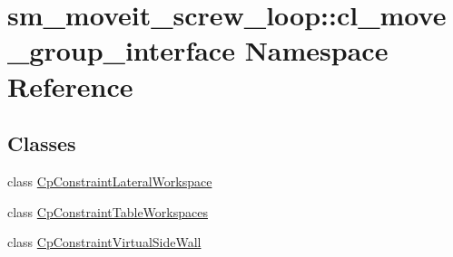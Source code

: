 \hypertarget{namespacesm__moveit__screw__loop_1_1cl__move__group__interface}{}\section{sm\+\_\+moveit\+\_\+screw\+\_\+loop\+:\+:cl\+\_\+move\+\_\+group\+\_\+interface Namespace Reference}
\label{namespacesm__moveit__screw__loop_1_1cl__move__group__interface}
\subsection*{Classes}
\begin{DoxyCompactItemize}
\item 
class \hyperlink{classsm__moveit__screw__loop_1_1cl__move__group__interface_1_1CpConstraintLateralWorkspace}{Cp\+Constraint\+Lateral\+Workspace}
\item 
class \hyperlink{classsm__moveit__screw__loop_1_1cl__move__group__interface_1_1CpConstraintTableWorkspaces}{Cp\+Constraint\+Table\+Workspaces}
\item 
class \hyperlink{classsm__moveit__screw__loop_1_1cl__move__group__interface_1_1CpConstraintVirtualSideWall}{Cp\+Constraint\+Virtual\+Side\+Wall}
\end{DoxyCompactItemize}
